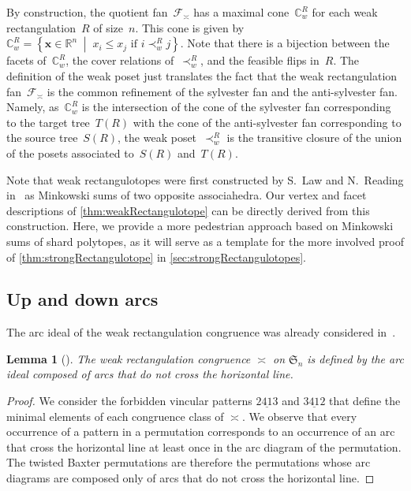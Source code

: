 \documentclass{amsart}
\newtheorem{lemma}[theorem]{Lemma}
\theoremstyle{definition}
\newcommand{\R}{\mathbb{R}} %
\renewcommand{\c}[1]{\mathcal{#1}} %
\renewcommand{\b}[1]{{\boldsymbol{#1}}} %
\newcommand{\f}[1]{\mathfrak{#1}} %
\newcommand{\set}[2]{\left\{ #1 \;\middle|\; #2 \right\}} %
\newcommand{\polytope}[1]{\mathds{#1}} %
\newcommand{\weakeq}{\asymp}
\begin{document}
By construction, the quotient fan~$\c{F}_\weakeq$ has a maximal cone~$\polytope{C}_w^R$ for each weak rectangulation~$R$ of size~$n$.
This cone is given by~$\polytope{C}_w^R = \set{\b{x} \in \R^n}{x_i \le x_j \text{ if } i \prec_w^R j}$. %
Note that there is a bijection between the facets of~$\polytope{C}_w^R$, the cover relations of~$\prec_w^R$, and the feasible flips in~$R$.
The definition of the weak poset just translates the fact that the weak rectangulation fan~$\c{F}_\weakeq$ is the common refinement of the sylvester fan and the anti-sylvester fan.
Namely, as~$\polytope{C}_w^R$ is the intersection of the cone of the sylvester fan corresponding to the target tree~$T(R)$ with the cone of the anti-sylvester fan corresponding to the source tree~$S(R)$, the weak poset~$\prec_w^R$ is the transitive closure of the union of the posets associated to~$S(R)$ and~$T(R)$.

Note that weak rectangulotopes were first constructed by S.~Law and N.~Reading in~\cite{MR2871762} as Minkowski sums of two opposite associahedra.
Our vertex and facet descriptions of \cref{thm:weakRectangulotope} can be directly derived from this construction.
Here, we provide a more pedestrian approach based on Minkowski sums of shard polytopes, as it will serve as a template for the more involved proof of \cref{thm:strongRectangulotope} in \cref{sec:strongRectangulotopes}.


\subsection{Up and down arcs}
\label{subsec:upDownArcs}

The arc ideal of the weak rectangulation congruence was already considered in~\cite[Exm.~4.10]{Reading-arcDiagrams}.

\begin{lemma}[{\cite[Exm.~4.10]{Reading-arcDiagrams}}]
The weak rectangulation congruence $\weakeq$ on $\f{S}_n$ is defined by the arc ideal composed of arcs that do not cross the horizontal line.
\end{lemma}
\begin{proof}
  We consider the forbidden vincular patterns $2\underline{41}3$ and $3\underline{41}2$ that define the minimal elements of each congruence class of $\weakeq$.
  We observe that every occurrence of a pattern in a permutation corresponds to an occurrence of an arc that cross the horizontal line at least once in the arc diagram of the permutation.
  The twisted Baxter permutations are therefore the permutations whose arc diagrams are composed only of arcs that do not cross the horizontal line.
\end{proof}
\end{document}
